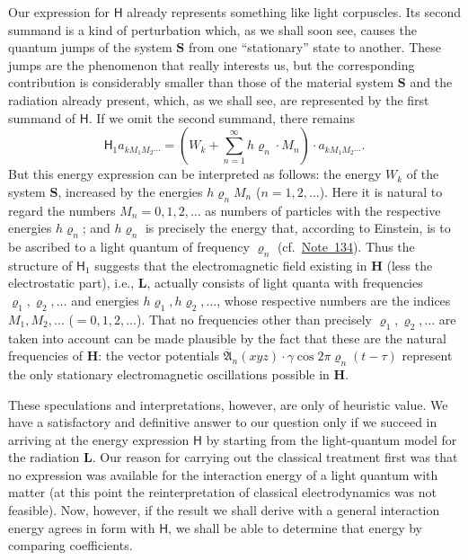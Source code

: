 \documentclass[fontsize=13pt,twoside,openany,headings=normal,parskip=false,bookmarkpackage=false,DIV=calc]{scrbook}
\begin{document}
Our expression for $\mathsf{H}$ already represents something like light corpuscles. Its second summand is a kind of perturbation which, as we shall soon see, causes the quantum jumps of the system $\boldsymbol{S}$ from one ``stationary'' state to another. These jumps are the phenomenon that really interests us, but the corresponding contribution is considerably smaller than those of the material system $\boldsymbol{S}$ and the radiation already present, which, as we shall see, are represented by the first summand of $\mathsf{H}$. If we omit the second summand, there remains
\[
 \mathsf{H}_1a_{kM_1M_2\cdots}=\left(W_k+\sum_{n=1}^{\infty}h\varrho_n\cdot M_n\right)\cdot a_{kM_1M_2\cdots}.
\]
But this energy expression can be interpreted as follows: the energy $W_k$ of the system $\boldsymbol{S}$, increased by the energies $h\varrho_n M_n$ ($n=1,2,\ldots$). Here it is natural to regard the numbers $M_n=0,1,2,\ldots$ as numbers of particles with the respective energies $h\varrho_n$; and $h\varrho_n$ is precisely the energy that, according to Einstein, is to be ascribed to a light quantum of frequency $\varrho_n$ (cf.\ \hyperlink{note-134}{Note~134}). Thus the structure of $\mathsf{H}_1$ suggests that the electromagnetic \hypertarget{origpage-145}{}field existing in $\boldsymbol H$ (less the electrostatic part), i.e., $\boldsymbol{L}$, actually consists of light quanta with frequencies $\varrho_1,\varrho_2,\ldots$ and energies $h\varrho_1,h\varrho_2,\ldots$, whose respective numbers are the indices $M_1,M_2,\ldots$ ($=0,1,2,\ldots$). That no frequencies other than precisely $\varrho_1,\varrho_2,\ldots$ are taken into account can be made plausible by the fact that these are the natural frequencies of $\boldsymbol H$: the vector potentials $\overline{\mathfrak A}_n(xyz)\cdot\gamma\cos2\pi\varrho_n(t-\tau)$ represent the only stationary electromagnetic oscillations possible in $\boldsymbol H$.

These speculations and interpretations, however, are only of heuristic value. We have a satisfactory and definitive answer to our question only if we succeed in arriving at the energy expression $\mathsf{H}$ by starting from the light-quantum model for the radiation $\boldsymbol{L}$. Our reason for carrying out the classical treatment first was that no expression was available for the interaction energy of a light quantum with matter (at this point the reinterpretation of classical electrodynamics was not feasible). Now, however, if the result we shall derive with a general interaction energy agrees in form with $\mathsf{H}$, we shall be able to determine that energy by comparing coefficients.
\end{document}
